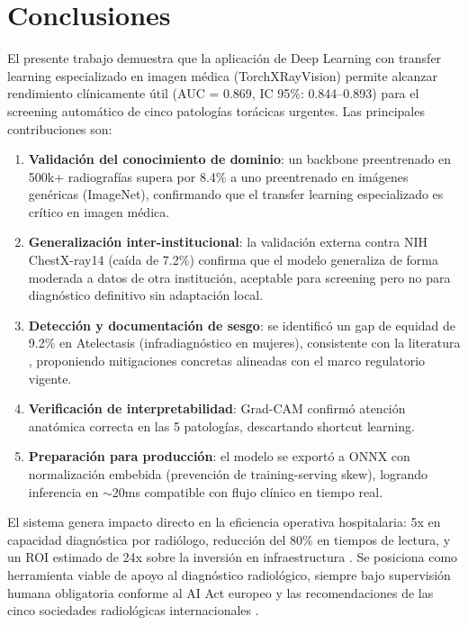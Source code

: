 \section{Conclusiones}
\label{sec:conclusions}

El presente trabajo demuestra que la aplicaci\'on de Deep Learning con transfer learning especializado en imagen m\'edica (TorchXRayVision) permite alcanzar rendimiento cl\'inicamente \'util (AUC = 0.869, IC 95\%: 0.844--0.893) para el screening autom\'atico de cinco patolog\'ias tor\'acicas urgentes. Las principales contribuciones son:

\begin{enumerate}
    \item \textbf{Validaci\'on del conocimiento de dominio}: un backbone preentrenado en 500k+ radiograf\'ias supera por 8.4\% a uno preentrenado en im\'agenes gen\'ericas (ImageNet), confirmando que el transfer learning especializado es cr\'itico en imagen m\'edica.
    \item \textbf{Generalizaci\'on inter-institucional}: la validaci\'on externa contra NIH ChestX-ray14 (ca\'ida de 7.2\%) confirma que el modelo generaliza de forma moderada a datos de otra instituci\'on, aceptable para screening pero no para diagn\'ostico definitivo sin adaptaci\'on local.
    \item \textbf{Detecci\'on y documentaci\'on de sesgo}: se identific\'o un gap de equidad de 9.2\% en Atelectasis (infradiagn\'ostico en mujeres), consistente con la literatura \cite{seyyedkalantari2021bias}, proponiendo mitigaciones concretas alineadas con el marco regulatorio vigente.
    \item \textbf{Verificaci\'on de interpretabilidad}: Grad-CAM confirm\'o atenci\'on anat\'omica correcta en las 5 patolog\'ias, descartando shortcut learning.
    \item \textbf{Preparaci\'on para producci\'on}: el modelo se export\'o a ONNX con normalizaci\'on embebida (prevenci\'on de training-serving skew), logrando inferencia en $\sim$20ms compatible con flujo cl\'inico en tiempo real.
\end{enumerate}

El sistema genera impacto directo en la eficiencia operativa hospitalaria: 5x en capacidad diagn\'ostica por radi\'ologo, reducci\'on del 80\% en tiempos de lectura, y un ROI estimado de 24x sobre la inversi\'on en infraestructura \cite{vanleeuwen2024roi}. Se posiciona como herramienta viable de apoyo al diagn\'ostico radiol\'ogico, siempre bajo supervisi\'on humana obligatoria conforme al AI Act europeo \cite{euaiact2024} y las recomendaciones de las cinco sociedades radiol\'ogicas internacionales \cite{brady2024multisociety}.

